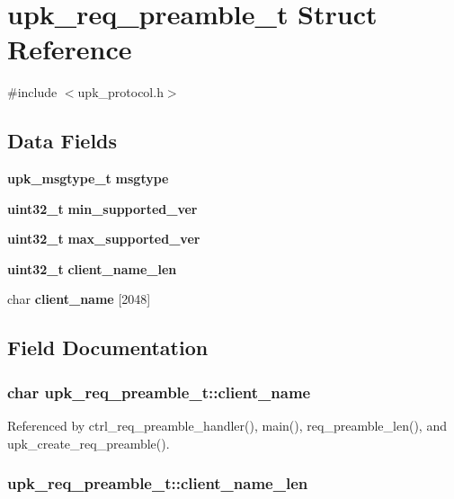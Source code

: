 \section{upk\_\-req\_\-preamble\_\-t Struct Reference}
\label{structupk__req__preamble__t}


{\ttfamily \#include $<$upk\_\-protocol.h$>$}

\subsection*{Data Fields}
\begin{DoxyCompactItemize}
\item 
{\bf upk\_\-msgtype\_\-t} {\bf msgtype}
\item 
{\bf uint32\_\-t} {\bf min\_\-supported\_\-ver}
\item 
{\bf uint32\_\-t} {\bf max\_\-supported\_\-ver}
\item 
{\bf uint32\_\-t} {\bf client\_\-name\_\-len}
\item 
char {\bf client\_\-name} [2048]
\end{DoxyCompactItemize}


\subsection{Field Documentation}
\subsubsection[{client\_\-name}]{\setlength{\rightskip}{0pt plus 5cm}char {\bf upk\_\-req\_\-preamble\_\-t::client\_\-name}}\label{structupk__req__preamble__t_adf95ad7581a49d120d294ab8d04524ef}


Referenced by ctrl\_\-req\_\-preamble\_\-handler(), main(), req\_\-preamble\_\-len(), and upk\_\-create\_\-req\_\-preamble().

\subsubsection[{client\_\-name\_\-len}]{ {\bf upk\_\-req\_\-preamble\_\-t::client\_\-name\_\-len}}\label{structupk__req__preamble__t_ab7c7470433e8489c766b23a63e4c08a5}


